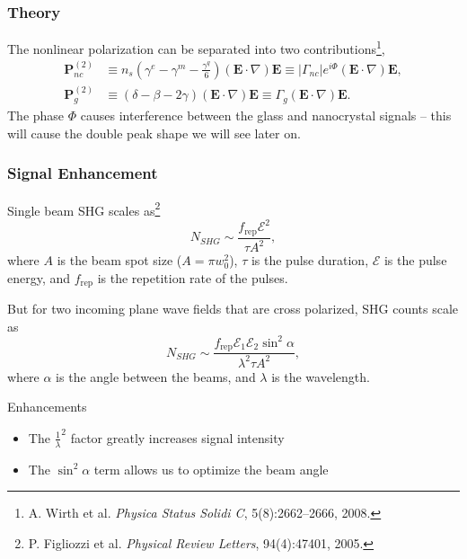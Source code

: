 \documentclass{beamer}
\begin{document}
\begin{frame}
\frametitle{Theory}
The nonlinear polarization can be separated into two contributions\footnote{A. Wirth et al. \emph{Physica Status Solidi C}, 5(8):2662--2666, 2008.},
\begin{align}
\mathbf{P}^{(2)}_{nc} &\equiv n_{s}\left(\gamma^{e}-\gamma^{m}-\frac{\gamma^{q}}{6}\right)\left(\mathbf{E}\cdot\nabla\right)\mathbf{E}\equiv \vert\Gamma_{nc}\vert e^{i\Phi}\left(\mathbf{E}\cdot\nabla\right)\mathbf{E},\label{eq_p_nc}\\
\mathbf{P}^{(2)}_{g} &\equiv \left(\delta-\beta- 2\gamma\right)\left(\mathbf{E}\cdot\nabla\right)\mathbf{E}\equiv \Gamma_{g}\left(\mathbf{E}\cdot\nabla\right)\mathbf{E}.
\end{align}
The phase $\Phi$ causes interference between the glass and nanocrystal signals -- this will cause the double peak shape we will see later on.
\end{frame}

\begin{frame}
\frametitle{Signal Enhancement}
Single beam SHG scales as\footnote{P. Figliozzi et al. \emph{Physical Review Letters}, 94(4):47401, 2005.}
\begin{equation}
N_{SHG} \sim \frac{f_{\text{rep}}\mathcal{E}^{2}}{\tau A^{2}},
\end{equation}
where $A$ is the beam spot size ($A = \pi w^{2}_{0}$), $\tau$ is the pulse duration, $\mathcal{E}$ is the pulse energy, and $f_{\text{rep}}$ is the repetition rate of the pulses.
\end{frame}

\begin{frame}
But for two incoming plane wave fields that are cross polarized, SHG counts scale as
\begin{equation}
N_{SHG} \sim \frac{f_{\text{rep}}\mathcal{E}_{1}\mathcal{E}_{2}\sin^{2}\alpha}{\lambda^{2}\tau A^{2}},
\end{equation}
where $\alpha$ is the angle between the beams, and $\lambda$ is the wavelength. 
\begin{block}{Enhancements}
\begin{itemize}
\item The $\frac{1}{\lambda}^{2}$ factor greatly increases signal intensity
\item The $\sin^{2}\alpha$ term allows us to optimize the beam angle 
\end{itemize}
\end{block}
\end{frame}
\end{document}
